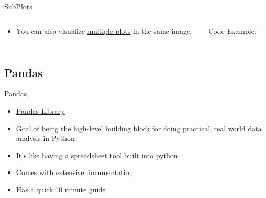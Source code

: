 % 
% 
% 
\begin{Slide}{SubPlots}
  \begin{columns}
    \begin{column}{.48\textwidth}
      
      \begin{itemize}

      \item You can also visualize \underline{\href{https://matplotlib.org/stable/gallery/subplots_axes_and_figures/subplots_demo.html}{multiple plots}} in the same image.
      \end{itemize}
      
      
    \end{column}

    \hfill

    \begin{column}{.48\textwidth}
      Code Example:
      
    \inputminted[firstline=3,
      lastline=23,
      breaklines,
      fontsize=\tiny,
      bgcolor=Background,
      linenos]{python}{../src/plot2.py}
      
      
    \end{column}
  \end{columns}

\end{Slide}

\subsection{Pandas}
% 
% 
% 
\begin{Slide}{Pandas}
  \begin{itemize}
    \item \underline{\href{https://pandas.pydata.org/}{Pandas Library}}
    \item Goal of being the high-level building block for doing practical, real world data analysis in Python
    \item It's like having a spreadsheet tool built into python
    \item Comes with extensive \underline{\href{https://pandas.pydata.org/docs/}{documentation}}
    \item Has a quick \underline{\href{https://pandas.pydata.org/docs/user_guide/10min.html\#min}{10 minute guide}}
  \end{itemize}
\end{Slide}

